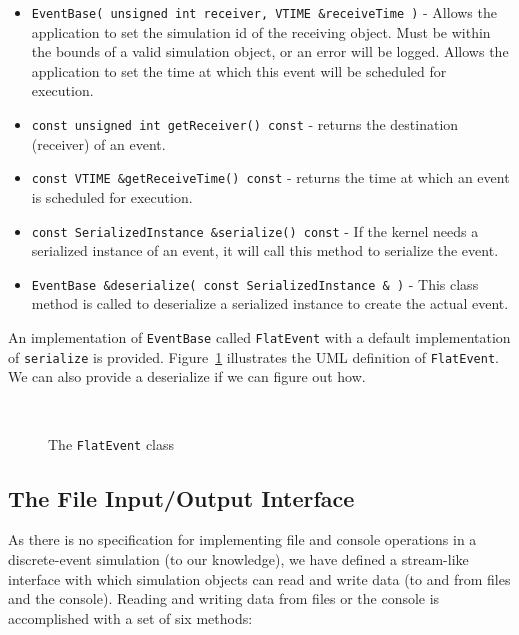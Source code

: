 \documentclass[11pt]{article}
\begin{document}
\begin{itemize}

\item{{\tt EventBase( unsigned int receiver,  VTIME \&receiveTime )}} -
Allows the application to set the simulation id of the receiving object.
Must be within the bounds of a valid simulation object, or an error will be
logged.  Allows the application to set the time at which this event will be
scheduled for execution.

\item{{\tt const unsigned int getReceiver() const}} - returns the destination (receiver) of an event.

\item{{\tt const VTIME \&getReceiveTime() const}} - returns the time at
which an event is scheduled for execution. 

\item{{\tt const SerializedInstance \&serialize() const}} - If the kernel 
needs a serialized instance of an event, it will call this method to 
serialize the event.

\item{{\tt EventBase \&deserialize( const SerializedInstance \& )}} - This
class method is called to deserialize a serialized instance to create the
actual event.

\end{itemize}

An implementation of {\tt EventBase} called {\tt FlatEvent} with a default
implementation of {\tt serialize} is provided.  Figure~\ref{fig:flatevent} 
illustrates the UML definition of {\tt FlatEvent}.  We can also provide a
deserialize if we can figure out how.

\begin{figure}
\begin{center}
\ 
\end{center}
\caption{The {\tt FlatEvent} class}\label{fig:flatevent}
\end{figure}

\subsection{The File Input/Output Interface}\label{fileio}

As there is no specification for implementing file and console operations
in a discrete-event simulation (to our knowledge), we have defined a
stream-like interface with which simulation objects can read and write
data (to and from files and the console). Reading and writing data from
files or the console is accomplished with a set of six methods: 
\end{document}
